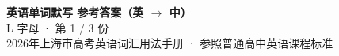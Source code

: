 \documentclass[10pt,a4paper]{article}
\begin{document}
\pagestyle{plain}

\begin{center}
{\LARGE\bfseries 英语单词默写 \quad 参考答案（英 $\to$ 中）}\\[0.22em]
{\large L 字母 · 第 1 / 3 份}\\[0.18em]
{\small 2026年上海市高考英语词汇用法手册 · 参照普通高中英语课程标准}
\end{center}

\vspace{0.2em}
\noindent{\color{rulegray}\rule{\textwidth}{0.8pt}}

\vspace{0.35em}

\vspace{0.25em}
\renewcommand{\arraystretch}{1.32}
\end{document}
